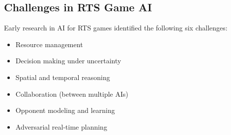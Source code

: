 \documentclass{llncs}
\begin{document}





\subsection{Challenges in RTS Game AI}\label{subsec:challenges}

Early research  in AI  for RTS  games \cite{Buro03rts}  identified the
following six challenges:
\begin{itemize}
\item Resource management
\item Decision making under uncertainty
\item Spatial and temporal reasoning
\item Collaboration (between multiple AIs)
\item Opponent modeling and learning
\item Adversarial real-time planning
\end{itemize}
\end{document}
